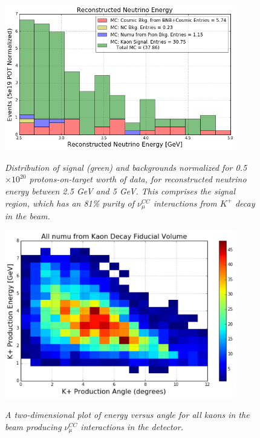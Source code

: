 %

\begin{figure}[ht!]
\centering
	\includegraphics[width=0.9\textwidth]{Figures/kaon_simonly_signal.png} \\
\caption{\textit{Distribution of signal (green) and backgrounds normalized for 0.5 $\times 10^{20}$ protons-on-target worth of data, for reconstructed neutrino energy between 2.5 GeV and 5 GeV. This comprises the signal region, which has an 81\% purity of $\nu_\mu^{CC}$ interactions from $K^+$ decay in the beam.}}\label{kaon_stack_signal_nodata}
\end{figure}


\begin{figure}[ht!]
\centering
	\includegraphics[width=0.9\textwidth]{Figures/all_kaon_energy_angle_2d.png} \\
\caption{\textit{A two-dimensional plot of energy versus angle for all kaons in the beam producing $\nu_\mu^{CC}$ interactions in the detector.}}\label{all_kaon_energy_angle_2d}
\end{figure}


